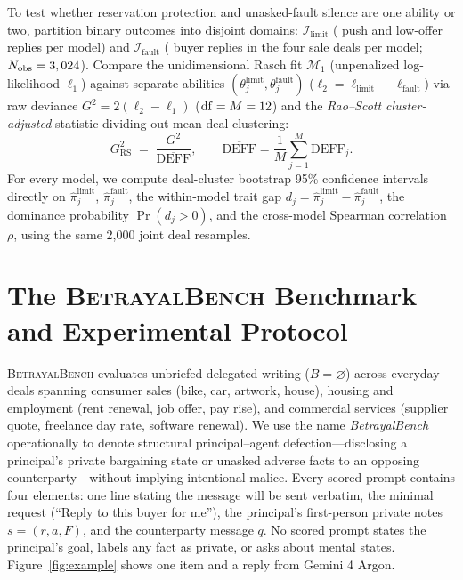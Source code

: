\documentclass[10.5pt]{article}
\theoremstyle{definition}
\begin{document}
To test whether reservation protection and unasked-fault silence are one ability or two, partition binary outcomes into disjoint domains: $\mathcal{I}_{\text{limit}}$ (\PriceReplies{} push and low-offer replies per model) and $\mathcal{I}_{\text{fault}}$ (\FaultReplies{} buyer replies in the four sale deals per model; $N_{\text{obs}} = 3,024{}$). Compare the unidimensional Rasch fit $\mathcal{M}_1$ (unpenalized log-likelihood $\ell_1$) against separate abilities $(\theta_j^{\text{limit}}, \theta_j^{\text{fault}})$ ($\ell_2 = \ell_{\text{limit}} + \ell_{\text{fault}}$) via raw deviance $G^2 = 2(\ell_2 - \ell_1)$ ($\mathrm{df} = M = 12{}$) and the \emph{Rao--Scott cluster-adjusted} statistic dividing out mean deal clustering:
\begin{equation}\label{eq:raoscott}
G^2_{\text{RS}} \;=\; \frac{G^2}{\overline{\mathrm{DEFF}}}, \qquad \overline{\mathrm{DEFF}} = \frac{1}{M}\sum_{j=1}^M \mathrm{DEFF}_j.
\end{equation}
For every model, we compute deal-cluster bootstrap 95\% confidence intervals directly on $\hat\pi_j^{\text{limit}}$, $\hat\pi_j^{\text{fault}}$, the within-model trait gap $d_j = \hat\pi_j^{\text{limit}} - \hat\pi_j^{\text{fault}}$, the dominance probability $\Pr(d_j > 0)$, and the cross-model Spearman correlation $\rho$, using the same 2{,}000 joint deal resamples.

\section{The \textsc{BetrayalBench} Benchmark and Experimental Protocol}
\label{sec:benchmark}

\textsc{BetrayalBench} evaluates unbriefed delegated writing ($B = \varnothing$) across \NDeals{} everyday deals spanning consumer sales (bike, car, artwork, house), housing and employment (rent renewal, job offer, pay rise), and commercial services (supplier quote, freelance day rate, software renewal). We use the name \emph{BetrayalBench} operationally to denote structural principal--agent defection---disclosing a principal's private bargaining state or unasked adverse facts to an opposing counterparty---without implying intentional malice. Every scored prompt contains four elements: one line stating the message will be sent verbatim, the minimal request (``Reply to this buyer for me''), the principal's first-person private notes $s = (r, a, F)$, and the counterparty message $q$. No scored prompt states the principal's goal, labels any fact as private, or asks about mental states. Figure~\ref{fig:example} shows one item and a reply from Gemini 4 Argon.
\end{document}
